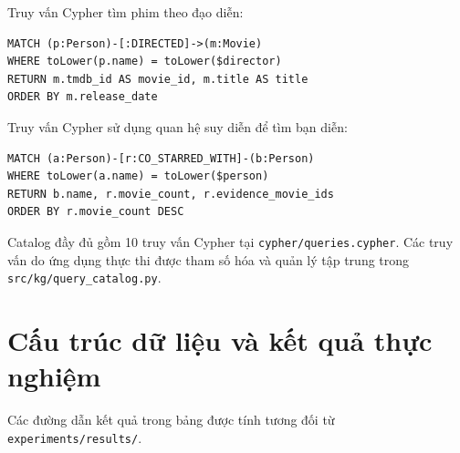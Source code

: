Truy vấn Cypher tìm phim theo đạo diễn:

\begin{Verbatim}[fontsize=\scriptsize,frame=single]
MATCH (p:Person)-[:DIRECTED]->(m:Movie)
WHERE toLower(p.name) = toLower($director)
RETURN m.tmdb_id AS movie_id, m.title AS title
ORDER BY m.release_date
\end{Verbatim}

Truy vấn Cypher sử dụng quan hệ suy diễn để tìm bạn diễn:

\begin{Verbatim}[fontsize=\scriptsize,frame=single]
MATCH (a:Person)-[r:CO_STARRED_WITH]-(b:Person)
WHERE toLower(a.name) = toLower($person)
RETURN b.name, r.movie_count, r.evidence_movie_ids
ORDER BY r.movie_count DESC
\end{Verbatim}

Catalog đầy đủ gồm 10 truy vấn Cypher tại \texttt{cypher/queries.cypher}. Các truy vấn do ứng dụng thực thi được tham số hóa
và quản lý tập trung trong \texttt{src/kg/query\_catalog.py}.

\chapter{Cấu trúc dữ liệu và kết quả thực nghiệm}

Các đường dẫn kết quả trong bảng được tính tương đối từ \texttt{experiments/results/}.

